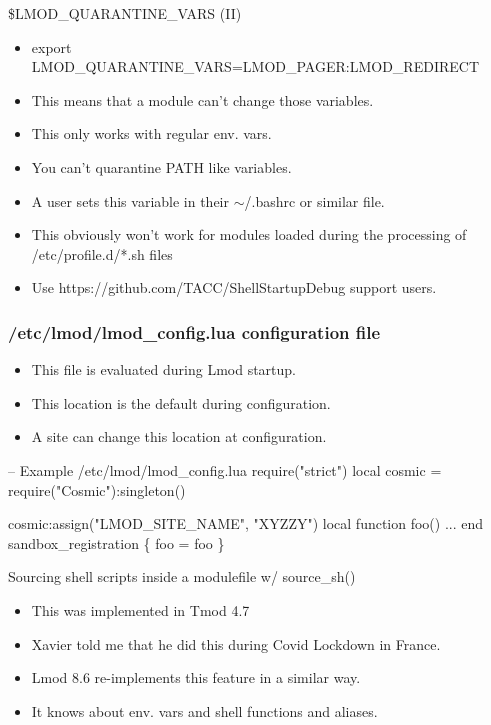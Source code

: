 \documentclass{beamer}
\begin{document}
\begin{frame}{\$LMOD\_QUARANTINE\_VARS (II)}
  \begin{itemize}
    \item export LMOD\_QUARANTINE\_VARS=LMOD\_PAGER:LMOD\_REDIRECT
    \item This means that a module can't change those variables.
    \item This only works with regular env. vars.
    \item You can't quarantine PATH like variables.
    \item A user sets this variable in their $\sim$/.bashrc or similar
      file.
    \item This obviously won't work for modules loaded during the
      processing of /etc/profile.d/*.sh files
    \item Use https://github.com/TACC/ShellStartupDebug support users.
  \end{itemize}
\end{frame}

\begin{frame}[fragile]
  \frametitle{/etc/lmod/lmod\_config.lua configuration file}
  \begin{itemize}
    \item This file is evaluated during Lmod startup. 
    \item This location is the default during configuration.
    \item A site can change this location at configuration.
  \end{itemize}
    {\small
\begin{semiverbatim}
-- Example /etc/lmod/lmod\_config.lua
require("strict")
local cosmic = require("Cosmic"):singleton()

cosmic:assign("LMOD\_SITE\_NAME", "XYZZY")
local function foo()
  ...
end
sandbox\_registration \{ foo = foo \}
\end{semiverbatim}
}
\end{frame}

\begin{frame}{Sourcing shell scripts inside a modulefile w/ source\_sh()}
  \begin{itemize}
    \item This was implemented in Tmod 4.7
    \item Xavier told me that he did this during Covid Lockdown in France.
    \item Lmod 8.6 re-implements this feature in a similar way.
    \item It knows about env. vars and shell functions and aliases.
  \end{itemize}
\end{frame}
\end{document}
